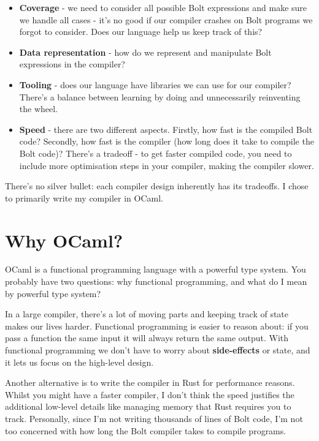 \begin{itemize}
\item
  \textbf{Coverage} - we need to consider all possible Bolt expressions
  and make sure we handle all cases - it's no good if our compiler
  crashes on Bolt programs we forgot to consider. Does our language help
  us keep track of this?
\item
  \textbf{Data representation} - how do we represent and manipulate Bolt
  expressions in the compiler?
\item
  \textbf{Tooling} - does our language have libraries we can use for our
  compiler? There's a balance between learning by doing and
  unnecessarily reinventing the wheel.
\item
  \textbf{Speed} - there are two different aspects. Firstly, how fast is
  the compiled Bolt code? Secondly, how fast is the compiler (how long
  does it take to compile the Bolt code)? There's a tradeoff - to get
  faster compiled code, you need to include more optimisation steps in
  your compiler, making the compiler slower.
\end{itemize}

There's no silver bullet: each compiler design inherently has its
tradeoffs. I chose to primarily write my compiler in OCaml.

\hypertarget{why-ocaml}{%
\section{\texorpdfstring{\protect\hyperlink{why-ocaml}{}Why
OCaml?}{Why OCaml?}}\label{why-ocaml}}

OCaml is a functional programming language with a powerful type system.
You probably have two questions: why functional programming, and what do
I mean by powerful type system?

In a large compiler, there's a lot of moving parts and keeping track of
state makes our lives harder. Functional programming is easier to reason
about: if you pass a function the same input it will always return the
same output. With functional programming we don't have to worry about
\textbf{side-effects} or state, and it lets us focus on the high-level
design.

Another alternative is to write the compiler in Rust for performance
reasons. Whilst you might have a faster compiler, I don't think the
speed justifies the additional low-level details like managing memory
that Rust requires you to track. Personally, since I'm not writing
thousands of lines of Bolt code, I'm not too concerned with how long the
Bolt compiler takes to compile programs.


